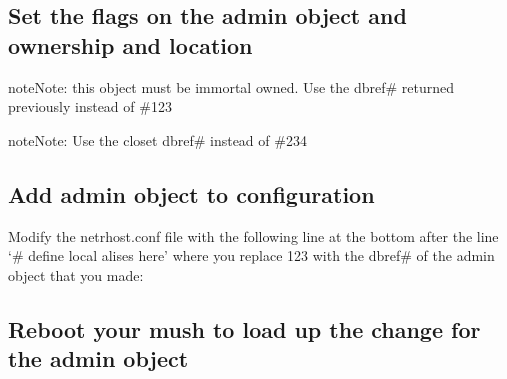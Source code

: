 \documentclass[letterpaper,10pt,english]{sphinxmanual}
\begin{document}
\subsection{Set the flags on the admin object and ownership and location}
\label{\detokenize{gettingstarted:set-the-flags-on-the-admin-object-and-ownership-and-location}}
\begin{sphinxadmonition}{note}{Note:}
\sphinxAtStartPar
this object must be immortal owned.  Use the dbref\# returned previously instead of \#123
\end{sphinxadmonition}

\begin{sphinxadmonition}{note}{Note:}
\sphinxAtStartPar
Use the closet dbref\# instead of \#234
\end{sphinxadmonition}

\begin{sphinxVerbatim}[commandchars=\\\{\}]
   
 
 
\end{sphinxVerbatim}


\subsection{Add admin object to configuration}
\label{\detokenize{gettingstarted:add-admin-object-to-configuration}}
\sphinxAtStartPar
Modify the netrhost.conf file with the following line at the bottom after the line ‘\# define local alises here’ where you replace 123 with the dbref\# of the admin object that you made:

\begin{sphinxVerbatim}[commandchars=\\\{\}]
 
\end{sphinxVerbatim}


\subsection{Reboot your mush to load up the change for the admin object}
\label{\detokenize{gettingstarted:reboot-your-mush-to-load-up-the-change-for-the-admin-object}}
\begin{sphinxVerbatim}[commandchars=\\\{\}]
\end{sphinxVerbatim}
\end{document}
